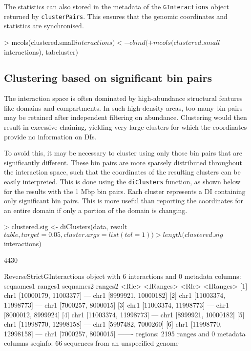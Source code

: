 \documentclass[12pt]{report}
\renewenvironment{Schunk}{\vspace{0pt}}{\vspace{0pt}}
\newcommand{\code}[1]{{\small\texttt{#1}}}
\begin{document}
The statistics can also stored in the metadata of the \code{GInteractions} object returned by \code{clusterPairs}. 
This ensures that the genomic coordinates and statistics are synchronised.

\begin{Schunk}
\begin{Sinput}
> mcols(clustered.small$interactions) <- cbind(
+     mcols(clustered.small$interactions), tabcluster)
\end{Sinput}
\end{Schunk}

\subsection{Clustering based on significant bin pairs}
\label{sec:sigclust}
The interaction space is often dominated by high-abundance structural features like domains and compartments. 
In such high-density areas, too many bin pairs may be retained after independent filtering on abundance.
Clustering would then result in excessive chaining, yielding very large clusters for which the coordinates provide no information on DIs.

To avoid this, it may be necessary to cluster using only those bin pairs that are significantly different.
These bin pairs are more sparsely distributed throughout the interaction space, such that the coordinates of the resulting clusters can be easily interpreted.
This is done using the \code{diClusters} function, as shown below for the results with the 1 Mbp bin pairs.
Each cluster represents a DI containing only significant bin pairs.
This is more useful than reporting the coordinates for an entire domain if only a portion of the domain is changing.

\begin{Schunk}
\begin{Sinput}
> clustered.sig <- diClusters(data, result$table, target=0.05, cluster.args=list(tol=1))
> length(clustered.sig$interactions)
\end{Sinput}
\begin{Soutput}
[1] 4430
\end{Soutput}
\begin{Soutput}
ReverseStrictGInteractions object with 6 interactions and 0 metadata columns:
      seqnames1              ranges1     seqnames2             ranges2
          <Rle>            <IRanges>         <Rle>           <IRanges>
  [1]      chr1 [10000179, 11003377] ---      chr1 [8999921, 10000182]
  [2]      chr1 [11003374, 11998773] ---      chr1 [7000257,  8000015]
  [3]      chr1 [11003374, 11998773] ---      chr1 [8000012,  8999924]
  [4]      chr1 [11003374, 11998773] ---      chr1 [8999921, 10000182]
  [5]      chr1 [11998770, 12998158] ---      chr1 [5997482,  7000260]
  [6]      chr1 [11998770, 12998158] ---      chr1 [7000257,  8000015]
  -------
  regions: 2195 ranges and 0 metadata columns
  seqinfo: 66 sequences from an unspecified genome
\end{Soutput}
\end{Schunk}
\end{document}
